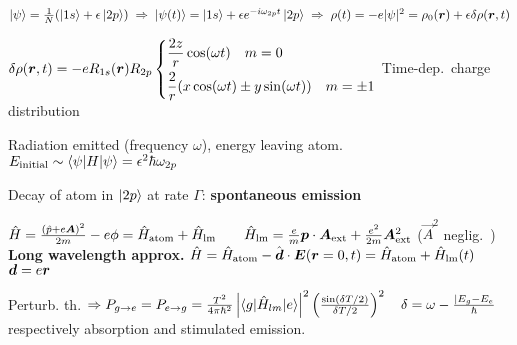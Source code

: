 \begin{squishlist}
    \item $\ket{\psi} = \frac{1}{N}(\ket{1s} + \epsilon \ket{2p}) \; \Rightarrow \; \ket{\psi(t)} = \ket{1s} + \epsilon e^{-i\omega_{2p}t}\ket{2p} \;  \Rightarrow \; \rho(t) = -e |\psi|^2 = \rho_0(\bm{r}) + \epsilon \delta \rho(\bm{r}, t)$
    \item $\delta \rho(\bm{r},t) = -e R_{1s}(\bm{r}) R_{2p} \left\{
    \begin{aligned}
        &\frac{2z}{r}\cos(\omega t) \quad m=0 \\
        &\frac{2}{r} (x \cos(\omega t) \pm y\sin(\omega t)) \quad m=\pm 1
    \end{aligned}
    \right.$
    Time-dep.\ charge distribution
    \item Radiation emitted (frequency $\omega$), energy leaving atom. $E_{\text{initial}} \sim \braket{\psi|H|\psi} = \epsilon^2 \hbar \omega_{2p}$
    \item Decay of atom in $\ket{2p}$ at rate $\Gamma$: \textbf{spontaneous emission}
\end{squishlist}

\begin{squishlist}
    \item $\hat{H} = \frac{(\hat{p} + e\bm{A})^2}{2m} - e\phi  = \hat{H} _{\text{atom}} + \hat{H}_{\text{lm}} \qquad \hat{H}_{\text{lm}}= \frac{e}{m}\bm{p}\cdot \bm{A}_{\text{ext}} + \frac{e^2}{2m}\bm{A}_{\text{ext}}^2$ \quad ($\vec{A}^2$ neglig.\ )\\
    \textbf{Long wavelength approx.} \quad$ \hat{H} = \hat{H}_{\text{atom}} - {\hat{\bm{d}}\cdot \bm{E}(\bm{r}=0,t)} = \hat{H}_{\text{atom}} + \hat{H}_{\text{lm}}(t)$ \quad $\bm{d} = e\bm{r}$
    \item Perturb. th. $\Rightarrow P_{g\rightarrow e} = P_{e \rightarrow g} = \frac{T^2}{4 \pi \hbar^2}\left| \braket{g|\hat{H}_{lm}|e}\right|^2 \left(\frac{\sin (\delta T / 2)}{\delta T / 2}\right)^2 \quad \delta = \omega - \frac{|E_g - E_e}{\hbar}$  \\
    respectively absorption and stimulated emission.
\end{squishlist}

